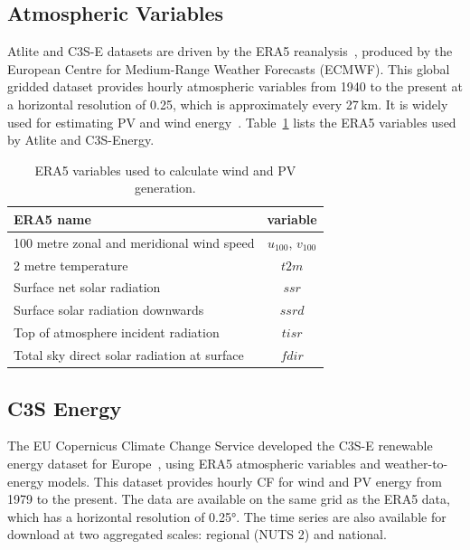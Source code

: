 \documentclass[a4paper, 11pt]{article}
\begin{document}
\subsection{Atmospheric Variables}
\label{sec:era5}
 
Atlite and C3S-E datasets are driven by the ERA5 reanalysis~\cite{hersbach2020era5}, produced by the European Centre for Medium-Range Weather Forecasts (ECMWF). This global gridded dataset provides hourly atmospheric variables from 1940 to the present at a horizontal resolution of 0.25\textdegree, which is approximately every 27\,km. It is widely used for estimating PV and wind energy~\cite{mockert2023drought, dubus2023energy, brown2021drought, otero2022drought}. Table~\ref{tab:var_name} lists the ERA5 variables used by Atlite and C3S-Energy.

\begin{table}[h!]
	\centering
	\begin{tabular}{|l|c|}
		\hline
		{\textbf{ERA5 name}}      & \textbf{variable} \\ \hline
		100 metre zonal and meridional wind speed   & $u_{100}$, $v_{100}$ \\
		2 metre temperature                         & $t2m$ \\
		Surface net solar radiation                 & $ssr$ \\
		Surface solar radiation downwards           & $ssrd$  \\
		Top of atmosphere incident radiation        & $tisr$  \\
		Total sky direct solar radiation at surface & $fdir$  \\ \hline
	\end{tabular}
	\caption{ERA5 variables used to calculate wind and PV generation.}
	\label{tab:var_name}
\end{table}

\subsection{C3S Energy}
\label{sec:c3se}

The EU Copernicus Climate Change Service developed the C3S-E renewable energy dataset for Europe~\cite{dubus2023energy}, using ERA5 atmospheric variables and weather-to-energy models. This dataset provides hourly CF for wind and PV energy from 1979 to the present. The data are available on the same grid as the ERA5 data, which has a horizontal resolution of 0.25°. The time series are also available for download at two aggregated scales: regional (NUTS 2) and national.
\end{document}
